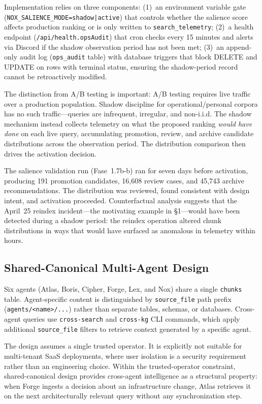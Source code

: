 \documentclass{article}
\begin{document}
Implementation relies on three components: (1)~an environment variable gate
(\texttt{NOX\_SALIENCE\_MODE=shadow|active}) that controls whether the salience score
affects production ranking or is only written to \texttt{search\_telemetry}; (2)~a health
endpoint (\texttt{/api/health.opsAudit}) that cron checks every 15 minutes and alerts via
Discord if the shadow observation period has not been met; (3)~an append-only audit log
(\texttt{ops\_audit} table) with database triggers that block DELETE and UPDATE on rows
with terminal status, ensuring the shadow-period record cannot be retroactively modified.

The distinction from A/B testing is important: A/B testing requires live traffic over a
production population. Shadow discipline for operational/personal corpora has no such
traffic---queries are infrequent, irregular, and non-i.i.d. The shadow mechanism instead
collects telemetry on what the proposed ranking \emph{would have done} on each live query,
accumulating promotion, review, and archive candidate distributions across the observation
period. The distribution comparison then drives the activation decision.

The salience validation run (Fase~1.7b-b) ran for seven days before activation, producing
191 promotion candidates, 16,608 review cases, and 45,743 archive recommendations. The
distribution was reviewed, found consistent with design intent, and activation proceeded.
Counterfactual analysis suggests that the April~25 reindex incident---the motivating example
in \S1---would have been detected during a shadow period: the reindex operation altered
chunk distributions in ways that would have surfaced as anomalous in telemetry within hours.

\subsection{Shared-Canonical Multi-Agent Design}

Six agents (Atlas, Boris, Cipher, Forge, Lex, and Nox) share a single \texttt{chunks}
table. Agent-specific content is distinguished by \texttt{source\_file} path prefix
(\texttt{agents/<name>/...}) rather than separate tables, schemas, or databases.
Cross-agent queries use \texttt{cross-search} and \texttt{cross-kg} CLI commands, which
apply additional \texttt{source\_file} filters to retrieve context generated by a specific
agent.

The design assumes a single trusted operator. It is explicitly not suitable for
multi-tenant SaaS deployments, where user isolation is a security requirement rather than
an engineering choice. Within the trusted-operator constraint, shared-canonical design
provides cross-agent intelligence as a structural property: when Forge ingests a decision
about an infrastructure change, Atlas retrieves it on the next architecturally relevant
query without any synchronization step.
\end{document}

